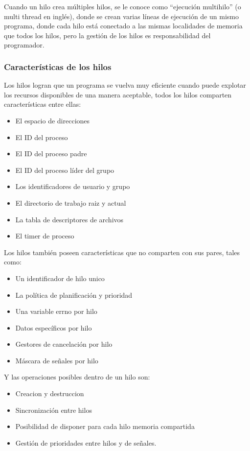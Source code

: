 Cuando un hilo crea múltiples hilos, se le conoce como ``ejecución multihilo'' (o multi thread en inglés), donde se crean varias líneas de ejecución de un mismo programa, donde cada hilo está conectado a las mismas localidades de memoria que todos los hilos, pero la gestión de los hilos es responsabilidad del programador.

\subsubsection{Características de los hilos}

Los hilos logran que un programa se vuelva muy eficiente cuando puede explotar los recursos disponibles de una manera aceptable, todos los hilos comparten características entre ellas:

\begin{itemize} \item   El espacio de direcciones \item   El ID del proceso \item   El ID del proceso padre \item   El ID del proceso líder del grupo \item   Los identificadores de usuario y grupo \item   El directorio de trabajo raiz y actual \item   La tabla de descriptores de archivos \item   El timer de proceso \end{itemize}

Los hilos también poseen características que no comparten con sus pares, tales como:

\begin{itemize} \item   Un identificador de hilo unico \item   La política de planificación y prioridad \item   Una variable errno por hilo \item   Datos específicos por hilo \item   Gestores de cancelación por hilo \item   Máscara de señales por hilo \end{itemize}

Y las operaciones posibles dentro de un hilo son:

\begin{itemize} \item   Creacion y destruccion \item   Sincronización entre hilos \item   Posibilidad de disponer para cada hilo memoria compartida \item   Gestión de prioridades entre hilos y de señales. \end{itemize}

